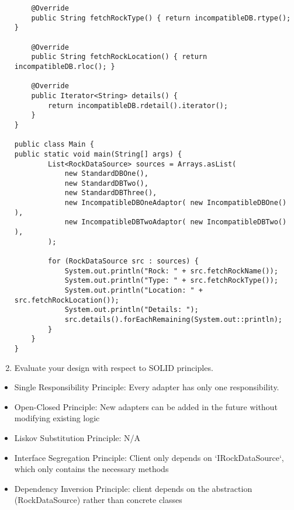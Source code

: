 \begin{enumerate}
\begin{verbatim}
    @Override
    public String fetchRockType() { return incompatibleDB.rtype(); }

    @Override
    public String fetchRockLocation() { return incompatibleDB.rloc(); }

    @Override
    public Iterator<String> details() { 
        return incompatibleDB.rdetail().iterator();
    }
}

public class Main {
public static void main(String[] args) {
        List<RockDataSource> sources = Arrays.asList(
            new StandardDBOne(),
            new StandardDBTwo(),
            new StandardDBThree(),
            new IncompatibleDBOneAdaptor( new IncompatibleDBOne() ),
            new IncompatibleDBTwoAdaptor( new IncompatibleDBTwo() ),
        );

        for (RockDataSource src : sources) {
            System.out.println("Rock: " + src.fetchRockName());
            System.out.println("Type: " + src.fetchRockType());
            System.out.println("Location: " + src.fetchRockLocation());
            System.out.println("Details: ");
            src.details().forEachRemaining(System.out::println);
        }
    }
}
\end{verbatim}



    \item Evaluate your design with respect to SOLID principles. 
\end{enumerate}

\begin{itemize}
    \item Single Responsibility Principle: Every adapter has only one responsibility.
    \item Open-Closed Principle: New adapters can be added in the future without modifying existing logic
    \item Liskov Substitution Principle: N/A
    \item Interface Segregation Principle: Client only depends on `IRockDataSource`, which only contains the necessary methods
    \item Dependency Inversion Principle: client depends on the abstraction (RockDataSource) rather than concrete classes
\end{itemize}






